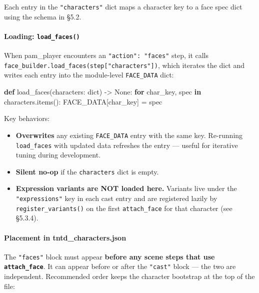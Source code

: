 \documentclass[
  11pt,
]{book}
\newenvironment{Shaded}{}{}
\newcommand{\BuiltInTok}[1]{\textcolor[rgb]{0.00,0.50,0.00}{#1}}
\newcommand{\ControlFlowTok}[1]{\textcolor[rgb]{0.00,0.44,0.13}{\textbf{#1}}}
\newcommand{\KeywordTok}[1]{\textcolor[rgb]{0.00,0.44,0.13}{\textbf{#1}}}
\newcommand{\NormalTok}[1]{#1}
\newcommand{\OperatorTok}[1]{\textcolor[rgb]{0.40,0.40,0.40}{#1}}
\newcommand{\VariableTok}[1]{\textcolor[rgb]{0.10,0.09,0.49}{#1}}
\providecommand{\tightlist}{%
  \setlength{\itemsep}{0pt}\setlength{\parskip}{0pt}}
\begin{document}
Each entry in the \texttt{"characters"} dict maps a character key to a
face spec dict using the schema in §5.2.

\paragraph{\texorpdfstring{Loading:
\texttt{load\_faces()}}{Loading: load\_faces()}}\label{loading-load_faces}

When pam\_player encounters an \texttt{"action":\ "faces"} step, it
calls \texttt{face\_builder.load\_faces(step{[}"characters"{]})}, which
iterates the dict and writes each entry into the module-level
\texttt{FACE\_DATA} dict:

\begin{Shaded}
\begin{Highlighting}[]
\KeywordTok{def}\NormalTok{ load\_faces(characters: }\BuiltInTok{dict}\NormalTok{) }\OperatorTok{{-}\textgreater{}} \VariableTok{None}\NormalTok{:}
    \ControlFlowTok{for}\NormalTok{ char\_key, spec }\KeywordTok{in}\NormalTok{ characters.items():}
\NormalTok{        FACE\_DATA[char\_key] }\OperatorTok{=}\NormalTok{ spec}
\end{Highlighting}
\end{Shaded}

Key behaviors:

\begin{itemize}
\tightlist
\item
  \textbf{Overwrites} any existing \texttt{FACE\_DATA} entry with the
  same key. Re-running \texttt{load\_faces} with updated data refreshes
  the entry --- useful for iterative tuning during development.
\item
  \textbf{Silent no-op} if the \texttt{characters} dict is empty.
\item
  \textbf{Expression variants are NOT loaded here.} Variants live under
  the \texttt{"expressions"} key in each cast entry and are registered
  lazily by \texttt{register\_variants()} on the first
  \texttt{attach\_face} for that character (see §5.3.4).
\end{itemize}

\paragraph{Placement in
tntd\_characters.json}\label{placement-in-tntd_characters.json}

The \texttt{"faces"} block must appear \textbf{before any scene steps
that use \texttt{attach\_face}}. It can appear before or after the
\texttt{"cast"} block --- the two are independent. Recommended order
keeps the character bootstrap at the top of the file:
\end{document}
